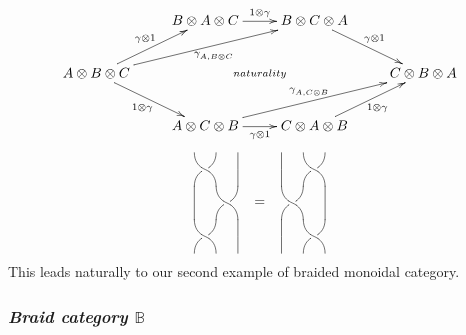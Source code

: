 \documentclass[a4paper,12pt]{article}
\theoremstyle{definition}
\theoremstyle{fact}
\theoremstyle{genquest}
\theoremstyle{step}
\newcommand{\BB}{\mathbb{B}}
\begin{document}
\[
\xymatrix{
  & B\otimes A \otimes C \ar[r]^-{1\otimes \gamma} 
    & B\otimes C \otimes A \ar[rd]^-{\gamma \otimes 1} \\
 A\otimes B\otimes C 
   \ar[ru]^-{\gamma \otimes 1} \ar[rru]_-{\;\gamma^{}_{A,B\otimes C}} 
    \ar[rd]_-{1\otimes \gamma} \ar@{}[rrr]|{naturality} 
    & & & C\otimes B \otimes A \\
 & A\otimes C \otimes B \ar[rru]^-{\gamma^{}_{A,C\otimes B}} \ar[r]_-{\gamma \otimes 1} 
   & C\otimes A \otimes B \ar[ru]_-{1\otimes \gamma} }
\]
\kern-20pt
\[
\xygraph{
!{/r1.3pc/: /u2pc/::}
!{\vtwistneg}
!{\xcapv-@(0)}
!{\vtwistneg}
[uuurr]
!{\xcapv@(0)}
[l]!{\vtwistneg}
[r]!{\xcapv@(0)}
[r][u(1.5)]
{=}
[r][u(1.5)]
!{\xcapv-@(0)}
!{\vtwistneg}
!{\xcapv-@(0)}
[uuur]
!{\vtwistneg}
[r]!{\xcapv@(0)}
[l]!{\vtwistneg}
}
\]
\noindent
This leads naturally to our second example of braided monoidal category.


\subsubsection*{{\it Braid category $\BB$}}
\end{document}
